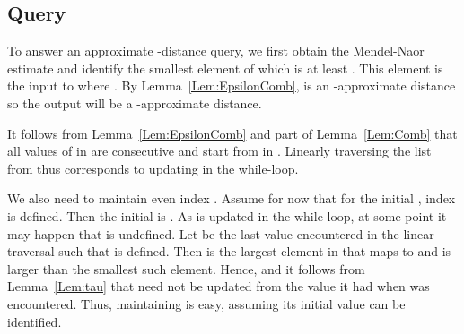\documentclass[11pt]{article}
\begin{document}
\subsection{Query}\label{subsec:Query}
To answer an approximate -distance query, we first obtain the Mendel-Naor estimate  and
identify the smallest element  of  which is at least .
This element is the input to  where .
By Lemma~\ref{Lem:EpsilonComb},  is an -approximate distance so the
output will be a -approximate distance.

It follows from Lemma~\ref{Lem:EpsilonComb} and part  of Lemma~\ref{Lem:Comb}
that all values of  in  are consecutive and start
from  in . Linearly traversing the list from  thus
corresponds to updating  in the while-loop.

We also need to maintain even index . Assume for now that for the initial , index
 is defined. Then the initial  is . As  is updated in the while-loop,
at some point it may happen that  is undefined. Let  be the last value encountered in the linear traversal
such that  is defined. Then  is the largest element in  that  maps to
 and  is larger than the smallest such element. Hence,
 and it follows from Lemma~\ref{Lem:tau} that  need
not be updated from the
value it had when  was encountered. Thus, maintaining  is easy, assuming its initial value can be identified.
\end{document}
